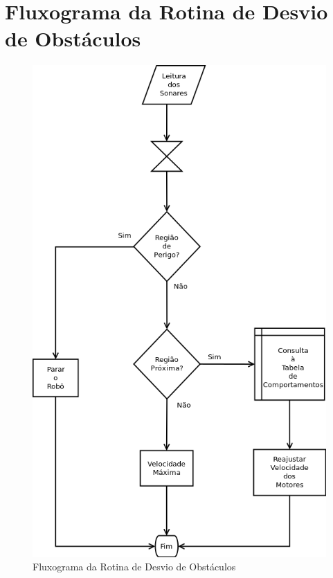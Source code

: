 \section{Fluxograma da Rotina de Desvio de Obstáculos}
  \begin{figure}[!htb]
    \centering
    \includegraphics[width=0.8 \linewidth]{../../Imagens/ObstAvoid.png}
    \caption{Fluxograma da Rotina de Desvio de Obstáculos}
    \label{ObstAvoid}
  \end{figure}